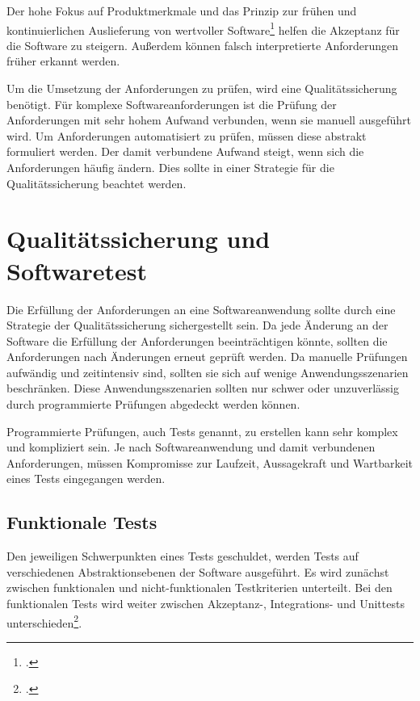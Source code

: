 Der hohe Fokus auf Produktmerkmale und das Prinzip zur frühen und kontinuierlichen Auslieferung von wertvoller Software\footcite[vgl.][]{agile-manifest-principles} helfen die Akzeptanz für die Software zu steigern. Außerdem können falsch interpretierte Anforderungen früher erkannt werden. 

Um die Umsetzung der Anforderungen zu prüfen, wird eine Qualitätssicherung benötigt. Für komplexe Softwareanforderungen ist die Prüfung der Anforderungen mit sehr hohem Aufwand verbunden, wenn sie manuell ausgeführt wird. Um Anforderungen automatisiert zu prüfen, müssen diese abstrakt formuliert werden. Der damit verbundene Aufwand steigt, wenn sich die Anforderungen häufig ändern. Dies sollte in einer Strategie für die Qualitätssicherung beachtet werden. 

\section{Qualitätssicherung und Softwaretest}

Die Erfüllung der Anforderungen an eine Softwareanwendung sollte durch eine Strategie der Qualitätssicherung sichergestellt sein. Da jede Änderung an der Software die Erfüllung der Anforderungen beeinträchtigen könnte, sollten die Anforderungen nach Änderungen erneut geprüft werden. Da manuelle Prüfungen aufwändig und zeitintensiv sind, sollten sie sich auf wenige Anwendungsszenarien beschränken. Diese Anwendungsszenarien sollten nur schwer oder unzuverlässig durch programmierte Prüfungen abgedeckt werden können.

Programmierte Prüfungen, auch Tests genannt, zu erstellen kann sehr komplex und kompliziert sein. Je nach Softwareanwendung und damit verbundenen Anforderungen, müssen Kompromisse zur Laufzeit, Aussagekraft und Wartbarkeit eines Tests eingegangen werden.

\subsection{Funktionale Tests}

Den jeweiligen Schwerpunkten eines Tests geschuldet, werden Tests auf verschiedenen Abstraktionsebenen der Software ausgeführt. Es wird zunächst zwischen funktionalen und nicht-funktionalen Testkriterien unterteilt.
Bei den funktionalen Tests wird weiter zwischen Akzeptanz-, Integrations- und Unittests unterschieden\footcite[S.159][]{software-quality2008}. 

